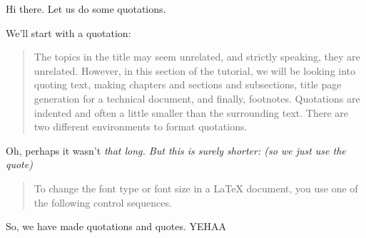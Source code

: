 \documentclass{article}
\begin{document}
Hi there. Let us do some quotations.

We'll start with a quotation:

\begin{quotation}
The topics in the title may seem unrelated, and strictly speaking, they are unrelated. However, in this section of the tutorial, we will be looking into quoting text, making chapters and sections and subsections, title page generation for a technical document, and finally, footnotes. 
Quotations are indented and often a little smaller than the surrounding text. There are two different environments to format quotations.
\end{quotation}

Oh, perhaps it wasn't \it that \rm long. But this is surely shorter: (so we just use the quote)

\begin{quote}
To change the font type or font size in a LaTeX document, you use one of the following control sequences.
\end{quote}

So, we have made quotations and quotes. \Large YEHAA
\end{document}

